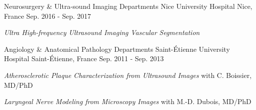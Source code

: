 

\begin{cventries}

  \cventry
    {Neurosurgery \& Ultra-sound Imaging Departments} %
    {Nice University Hospital} %
    {Nice, France} %
    {Sep. 2016 - Sep. 2017} %
    {
      \begin{cvitems} %
        \item {\textit{Ultra High-frequency Ultrasound Imaging Vascular Segmentation} \hyperlink{AFD+19}{\honordatestyle{[AFD+19]}}}
      \end{cvitems}
    }

  \cventry
    {Angiology \& Anatomical Pathology Departments} %
    {Saint-Étienne University Hospital} %
    {Saint-Étienne, France} %
    {Sep. 2011 - Sep. 2013} %
    {
      \begin{cvitems} %
        \item {\textit{Atherosclerotic Plaque Characterization from Ultrasound Images} with C. Boissier, MD/PhD}
        \item {\textit{Laryngeal Nerve Modeling from Microscopy Images} with M.-D. Dubois, MD/PhD}
      \end{cvitems}
    }

\end{cventries}
